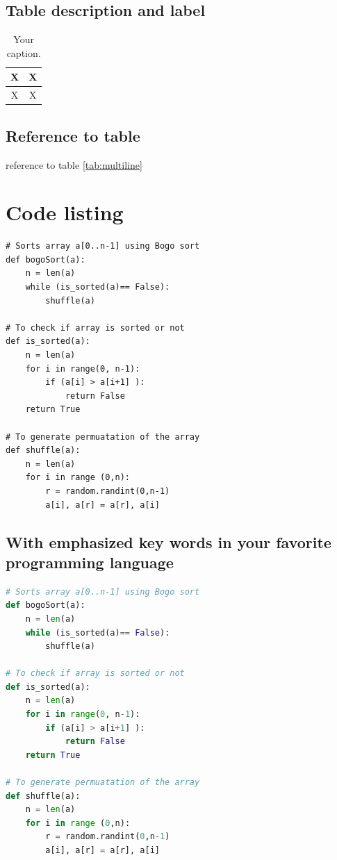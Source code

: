 \documentclass{article}
\begin{document}
\subsection{Table description and label}

\begin{table}[ht]
\centering
\begin{tabular}{|c|c|}
    \hline
    X & X\\
    \hline
    X & X\\
    \hline
\end{tabular}
\caption{Your caption.}
\end{table}
\raggedright

\subsection{Reference to table}

reference to table \ref{tab:multiline}

\section{Code listing}
\begin{lstlisting}
# Sorts array a[0..n-1] using Bogo sort 
def bogoSort(a): 
    n = len(a) 
    while (is_sorted(a)== False): 
        shuffle(a) 
  
# To check if array is sorted or not 
def is_sorted(a): 
    n = len(a) 
    for i in range(0, n-1): 
        if (a[i] > a[i+1] ): 
            return False
    return True
  
# To generate permuatation of the array 
def shuffle(a): 
    n = len(a) 
    for i in range (0,n): 
        r = random.randint(0,n-1) 
        a[i], a[r] = a[r], a[i] 
\end{lstlisting}
\subsection{With emphasized key words in your favorite programming language}
\begin{lstlisting}[language=Python]
# Sorts array a[0..n-1] using Bogo sort 
def bogoSort(a): 
    n = len(a) 
    while (is_sorted(a)== False): 
        shuffle(a) 
  
# To check if array is sorted or not 
def is_sorted(a): 
    n = len(a) 
    for i in range(0, n-1): 
        if (a[i] > a[i+1] ): 
            return False
    return True
  
# To generate permuatation of the array 
def shuffle(a): 
    n = len(a) 
    for i in range (0,n): 
        r = random.randint(0,n-1) 
        a[i], a[r] = a[r], a[i] 
\end{lstlisting}
\end{document}
